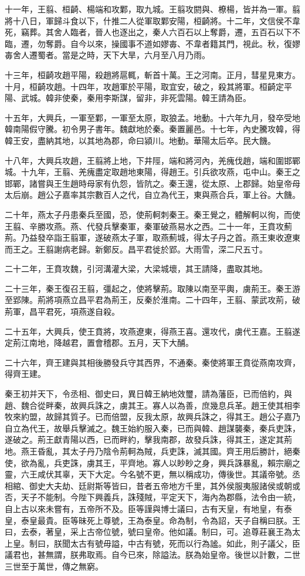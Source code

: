 十一年，王翦、桓齮、楊端和攻鄴，取九城。王翦攻閼與、橑楊，皆并為一軍。翦將十八日，軍歸斗食以下，什推二人從軍取鄴安陽，桓齮將。十二年，文信侯不韋死，竊葬。其舍人臨者，晉人也逐出之，秦人六百石以上奪爵，遷，五百石以下不臨，遷，勿奪爵。自今以來，操國事不道如嫪毐、不韋者籍其門，視此。秋，復嫪毐舍人遷蜀者。當是之時，天下大旱，六月至八月乃雨。

十三年，桓齮攻趙平陽，殺趙將扈輒，斬首十萬。王之河南。正月，彗星見東方。十月，桓齮攻趙。十四年，攻趙軍於平陽，取宜安，破之，殺其將軍。桓齮定平陽、武城。韓非使秦，秦用李斯謀，留非，非死雲陽。韓王請為臣。

十五年，大興兵，一軍至鄴，一軍至太原，取狼孟。地動。十六年九月，發卒受地韓南陽假守騰。初令男子書年。魏獻地於秦。秦置麗邑。十七年，內史騰攻韓，得韓王安，盡納其地，以其地為郡，命曰潁川。地動。華陽太后卒。民大饑。

十八年，大興兵攻趙，王翦將上地，下井陘，端和將河內，羌瘣伐趙，端和圍邯鄲城。十九年，王翦、羌瘣盡定取趙地東陽，得趙王。引兵欲攻燕，屯中山。秦王之邯鄲，諸嘗與王生趙時母家有仇怨，皆阬之。秦王還，從太原、上郡歸。始皇帝母太后崩。趙公子嘉率其宗數百人之代，自立為代王，東與燕合兵，軍上谷。大饑。

二十年，燕太子丹患秦兵至國，恐，使荊軻刺秦王。秦王覺之，體解軻以徇，而使王翦、辛勝攻燕。燕、代發兵擊秦軍，秦軍破燕易水之西。二十一年，王賁攻薊荊。乃益發卒詣王翦軍，遂破燕太子軍，取燕薊城，得太子丹之首。燕王東收遼東而王之。王翦謝病老歸。新鄭反。昌平君徙於郢。大雨雪，深二尺五寸。

二十二年，王賁攻魏，引河溝灌大梁，大梁城壞，其王請降，盡取其地。

二十三年，秦王復召王翦，彊起之，使將擊荊。取陳以南至平輿，虜荊王。秦王游至郢陳。荊將項燕立昌平君為荊王，反秦於淮南。二十四年，王翦、蒙武攻荊，破荊軍，昌平君死，項燕遂自殺。

二十五年，大興兵，使王賁將，攻燕遼東，得燕王喜。還攻代，虜代王嘉。王翦遂定荊江南地，降越君，置會稽郡。五月，天下大酺。

二十六年，齊王建與其相後勝發兵守其西界，不通秦。秦使將軍王賁從燕南攻齊，得齊王建。

秦王初并天下，令丞相、御史曰，異日韓王納地效璽，請為藩臣，已而倍約，與趙、魏合從畔秦，故興兵誅之，虜其王。寡人以為善，庶幾息兵革。趙王使其相李牧來約盟，故歸其質子。已而倍盟，反我太原，故興兵誅之，得其王。趙公子嘉乃自立為代王，故舉兵擊滅之。魏王始約服入秦，已而與韓、趙謀襲秦，秦兵吏誅，遂破之。荊王獻青陽以西，已而畔約，擊我南郡，故發兵誅，得其王，遂定其荊地。燕王昏亂，其太子丹乃陰令荊軻為賊，兵吏誅，滅其國。齊王用后勝計，絕秦使，欲為亂，兵吏誅，虜其王，平齊地。寡人以眇眇之身，興兵誅暴亂，賴宗廟之靈，六王咸伏其辜，天下大定。今名號不更，無以稱成功，傳後世。其議帝號。丞相綰、御史大夫劫、廷尉斯等皆曰，昔者五帝地方千里，其外侯服夷服諸侯或朝或否，天子不能制。今陛下興義兵，誅殘賊，平定天下，海內為郡縣，法令由一統，自上古以來未嘗有，五帝所不及。臣等謹與博士議曰，古有天皇，有地皇，有泰皇，泰皇最貴。臣等昧死上尊號，王為泰皇。命為制，令為詔，天子自稱曰朕。王曰，去泰，著皇，采上古帝位號，號曰皇帝。他如議。制曰，可。追尊莊襄王為太上皇。制曰，朕聞太古有號毋謚，中古有號，死而以行為謐。如此，則子議父，臣議君也，甚無謂，朕弗取焉。自今已來，除謚法。朕為始皇帝。後世以計數，二世三世至于萬世，傳之無窮。

